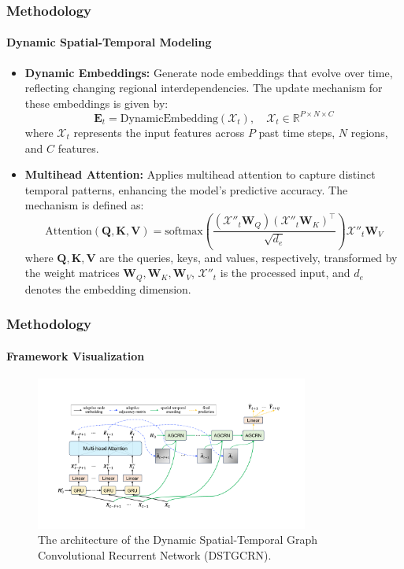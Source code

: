 \documentclass[light]{lutbeamer} %
\begin{document}
\begin{frame}
    \frametitle{Methodology}
    \framesubtitle{Dynamic Spatial-Temporal Modeling}
    \begin{itemize}
        \item \textbf{Dynamic Embeddings:}
              Generate node embeddings that evolve over time, reflecting changing regional interdependencies. The update mechanism for these embeddings is given by:
              \[
                  \bm{E}_t = \text{DynamicEmbedding}(\bm{\mathcal{X}}_t), \quad \bm{\mathcal{X}}_t \in \mathbb{R}^{P \times N \times C}
              \]
              where \( \bm{\mathcal{X}}_t \) represents the input features across \( P \) past time steps, \( N \) regions, and \( C \) features.

        \item \textbf{Multihead Attention:}
              Applies multihead attention to capture distinct temporal patterns, enhancing the model's predictive accuracy. The mechanism is defined as:
              \[
                  \text{Attention}(\mathbf{Q}, \mathbf{K}, \mathbf{V}) = \text{softmax}\left(\frac{(\bm{\mathcal{X}}''_t \bm{W}_Q)(\bm{\mathcal{X}}''_t \bm{W}_K)^\top}{\sqrt{d_e}}\right)\bm{\mathcal{X}}''_t \bm{W}_V
              \]
              where \(\mathbf{Q}, \mathbf{K}, \mathbf{V}\) are the queries, keys, and values, respectively, transformed by the weight matrices \(\bm{W}_Q, \bm{W}_K, \bm{W}_V\), \( \bm{\mathcal{X}}''_t \) is the processed input, and \( d_e \) denotes the embedding dimension.
    \end{itemize}
\end{frame}


\begin{frame}
    \frametitle{Methodology}
    \framesubtitle{Framework Visualization}
    \begin{figure}
        \centering
        \includegraphics[width=0.8\textwidth]{figures/dstgcrn_framework.pdf}
        \caption{The architecture of the Dynamic Spatial-Temporal Graph Convolutional Recurrent Network (DSTGCRN).}
    \end{figure}
\end{frame}
\end{document}
